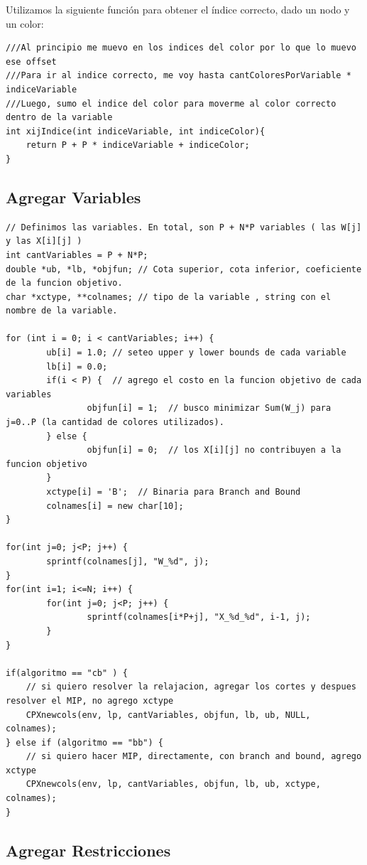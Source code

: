 \documentclass[a4paper, 10pt, twoside]{article}
\begin{document}
Utilizamos la siguiente función para obtener el índice correcto, dado un nodo y un color:

\begin{lstlisting}
///Al principio me muevo en los indices del color por lo que lo muevo ese offset
///Para ir al indice correcto, me voy hasta cantColoresPorVariable * indiceVariable
///Luego, sumo el indice del color para moverme al color correcto dentro de la variable
int xijIndice(int indiceVariable, int indiceColor){
    return P + P * indiceVariable + indiceColor;
}
\end{lstlisting}


\subsection{Agregar Variables}

\begin{lstlisting}
// Definimos las variables. En total, son P + N*P variables ( las W[j] y las X[i][j] )
int cantVariables = P + N*P;
double *ub, *lb, *objfun; // Cota superior, cota inferior, coeficiente de la funcion objetivo.
char *xctype, **colnames; // tipo de la variable , string con el nombre de la variable.

for (int i = 0; i < cantVariables; i++) {
		ub[i] = 1.0; // seteo upper y lower bounds de cada variable
		lb[i] = 0.0;
		if(i < P) {  // agrego el costo en la funcion objetivo de cada variables
				objfun[i] = 1;  // busco minimizar Sum(W_j) para j=0..P (la cantidad de colores utilizados).
		} else {
				objfun[i] = 0;  // los X[i][j] no contribuyen a la funcion objetivo
		}
		xctype[i] = 'B';  // Binaria para Branch and Bound
		colnames[i] = new char[10];
}

for(int j=0; j<P; j++) {
		sprintf(colnames[j], "W_%d", j);
}
for(int i=1; i<=N; i++) {
		for(int j=0; j<P; j++) {
				sprintf(colnames[i*P+j], "X_%d_%d", i-1, j);
		}
}

if(algoritmo == "cb" ) {
	// si quiero resolver la relajacion, agregar los cortes y despues resolver el MIP, no agrego xctype
	CPXnewcols(env, lp, cantVariables, objfun, lb, ub, NULL, colnames);
} else if (algoritmo == "bb") {
	// si quiero hacer MIP, directamente, con branch and bound, agrego xctype
	CPXnewcols(env, lp, cantVariables, objfun, lb, ub, xctype, colnames);
}
\end{lstlisting}

\subsection{Agregar Restricciones}
\end{document}
